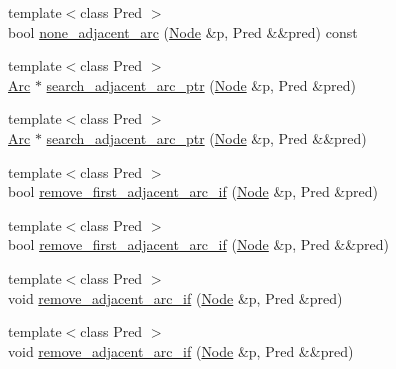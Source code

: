 \begin{DoxyCompactItemize}
\item 
{\footnotesize template$<$class Pred $>$ }\\bool \hyperlink{class_designar_1_1_base_graph_adbacdf829cb2f21aff498bac9c9a8b8b}{none\+\_\+adjacent\+\_\+arc} (\hyperlink{namespace_designar_a5af326c65aa2bd26b26c410f2030d09e}{Node} \&p, Pred \&\&pred) const
\item 
{\footnotesize template$<$class Pred $>$ }\\\hyperlink{namespace_designar_a3f55fb5513d62ff47cbc8f72b8e95d6f}{Arc} $\ast$ \hyperlink{class_designar_1_1_base_graph_a4c9703fdb22d4e1d3cf0428fd705b3ee}{search\+\_\+adjacent\+\_\+arc\+\_\+ptr} (\hyperlink{namespace_designar_a5af326c65aa2bd26b26c410f2030d09e}{Node} \&p, Pred \&pred)
\item 
{\footnotesize template$<$class Pred $>$ }\\\hyperlink{namespace_designar_a3f55fb5513d62ff47cbc8f72b8e95d6f}{Arc} $\ast$ \hyperlink{class_designar_1_1_base_graph_aac7ed362d5f21fcc6e583d4b9e03babb}{search\+\_\+adjacent\+\_\+arc\+\_\+ptr} (\hyperlink{namespace_designar_a5af326c65aa2bd26b26c410f2030d09e}{Node} \&p, Pred \&\&pred)
\item 
{\footnotesize template$<$class Pred $>$ }\\bool \hyperlink{class_designar_1_1_base_graph_ab7c2c2129abb3200b854e23f34e513e8}{remove\+\_\+first\+\_\+adjacent\+\_\+arc\+\_\+if} (\hyperlink{namespace_designar_a5af326c65aa2bd26b26c410f2030d09e}{Node} \&p, Pred \&pred)
\item 
{\footnotesize template$<$class Pred $>$ }\\bool \hyperlink{class_designar_1_1_base_graph_abe36f7676c51362b9a0f560d3c062772}{remove\+\_\+first\+\_\+adjacent\+\_\+arc\+\_\+if} (\hyperlink{namespace_designar_a5af326c65aa2bd26b26c410f2030d09e}{Node} \&p, Pred \&\&pred)
\item 
{\footnotesize template$<$class Pred $>$ }\\void \hyperlink{class_designar_1_1_base_graph_af1653bc8e50c53d27997951798a8a716}{remove\+\_\+adjacent\+\_\+arc\+\_\+if} (\hyperlink{namespace_designar_a5af326c65aa2bd26b26c410f2030d09e}{Node} \&p, Pred \&pred)
\item 
{\footnotesize template$<$class Pred $>$ }\\void \hyperlink{class_designar_1_1_base_graph_a10423075ea81c629e88974fa882ec903}{remove\+\_\+adjacent\+\_\+arc\+\_\+if} (\hyperlink{namespace_designar_a5af326c65aa2bd26b26c410f2030d09e}{Node} \&p, Pred \&\&pred)
\item 

\end{DoxyCompactItemize}
